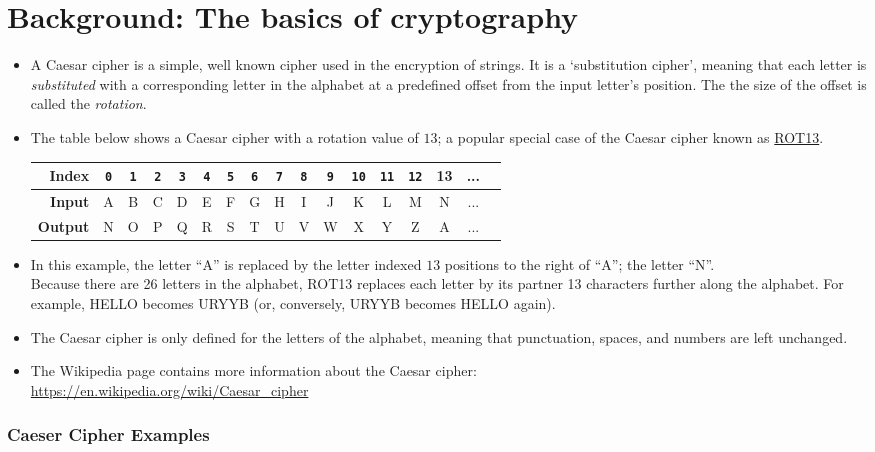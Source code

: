 \documentclass[11pt]{report}
\begin{document}
\section*{Background: The basics of cryptography}
\begin{itemize}
	\item A Caesar cipher is a simple, well known cipher used in the encryption of strings. It is a `substitution cipher', meaning that each letter is \emph{substituted} with a corresponding letter in the alphabet at a predefined offset from the input letter's position. The the size of the offset is called the \emph{rotation}.
	\item The table below shows a Caesar cipher with a rotation value of $13$; a popular special case of the Caesar cipher known as \href{https://www.wikiwand.com/en/ROT13}{ROT13}. 
	\begin{table}[h]
		\centering
		\begin{tabular}{|r|c|c|c|c|c|c|c|c|c|c|c|c|c|c|c|c|}
		\hline
		\textbf{Index} & {\tt 0} & {\tt 1} & {\tt 2} & {\tt 3} & {\tt 4} & {\tt 5} & {\tt 6} & {\tt 7} & {\tt 8} & {\tt 9} & {\tt 10} & {\tt 11} & {\tt 12} & 13 & ... \\ \hline
		\textbf{Input} & A & B & C & D & E & F & G & H & I & J & K  & L  & M & N & ... \\ \hline
		\textbf{Output} & N & O & P & Q & R & S & T & U & V & W & X  & Y  & Z & A & ... \\ \hline
		\end{tabular}
	\end{table}
	\item In this example, the letter ``A'' is replaced by the letter indexed $13$ positions to the right of ``A''; the letter ``N''. \\ Because there are 26 letters in the alphabet, ROT13 replaces each letter by its partner 13 characters further along the alphabet. For example, HELLO becomes URYYB (or, conversely, URYYB becomes HELLO again).
	\item The Caesar cipher is only defined for the letters of the alphabet, meaning that punctuation, spaces, and numbers are left unchanged.
	\item The Wikipedia page contains more information
	about the Caesar cipher: \\ \url{https://en.wikipedia.org/wiki/Caesar_cipher}
\end{itemize}

\subsubsection*{Caeser Cipher Examples}
\end{document}
